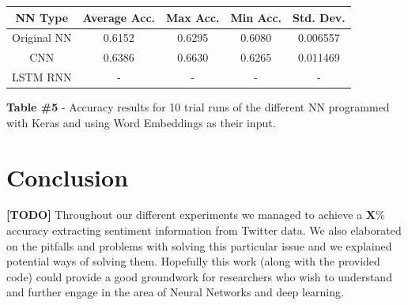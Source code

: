 \documentclass[11pt,onecolumn]{article} %
\begin{document}
\begin{center}
	\begin{tabular}{ | c | c | c | c | c |}
		\hline
		NN Type & Average Acc. & Max Acc. & Min Acc. & Std. Dev. \\
		\hline
		Original NN & 0.6152 &	0.6295 &	0.6080 & 0.006557 \\
		\hline
		CNN & 0.6386 & 0.6630 & 0.6265 & 0.011469 \\
		\hline
		LSTM RNN & - & - & - & - \\
		\hline
	\end{tabular}
	\newline
	\newline
	\textbf{Table \#5} - Accuracy results for 10 trial runs of the different NN programmed with Keras and using Word Embeddings as their input.
\end{center}


\section{Conclusion}
\textbf{[TODO]}
Throughout our different experiments we managed to achieve a \textbf{X}\% accuracy extracting sentiment information from Twitter data. We also elaborated on the pitfalls and problems with solving this particular issue and we explained potential ways of solving them.
Hopefully this work (along with the provided code) could provide a good groundwork for researchers who wish to understand and further engage in the area of Neural Networks and deep learning.

\end{document}
